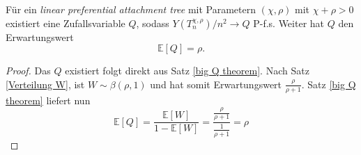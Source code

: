 \begin{Korollar}
    Für ein \textit{linear preferential attachment tree} mit Parametern $(\chi,\rho)$ mit $\chi+ \rho > 0$ existiert eine Zufallsvariable $Q$, sodass $Y(T_n^{\chi,\rho})/n^2 \to Q$ P-f.s. Weiter hat $Q$ den Erwartungswert 
    \[
        \mathbb{E}[Q] = \rho.
    \]
\end{Korollar}
\begin{proof}
    Das $Q$ existiert folgt direkt aus Satz \ref{big Q theorem}. Nach Satz \ref{Verteilung W}, ist $W \sim \beta(\rho,1)$ und hat somit Erwartungswert $\frac{\rho}{\rho + 1}$. Satz \ref{big Q theorem} liefert nun
    \begin{equation*}
        \mathbb{E}[Q] = \frac{\mathbb{E}[W]}{1-\mathbb{E}[W]} = \frac{\frac{\rho}{\rho + 1}}{\frac{1}{\rho+1}} = \rho
    \end{equation*}
\end{proof}